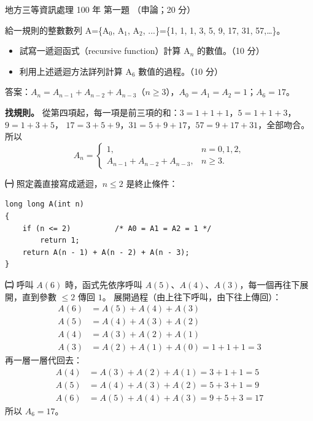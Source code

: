 \begin{pastexam}[label={px:df3-100-ds-01}]{地方三等資訊處理 100 年 第一題}
（申論；20 分）

給一規則的整數數列 A=\{A$_0$, A$_1$, A$_2$, ...\}=\{1, 1, 1, 3, 5, 9, 17, 31, 57,…\}。
\begin{itemize}[leftmargin=2.2em, nosep]
\item[㈠] 試寫一遞迴函式（recursive function）計算 A$_n$ 的數值。（10 分）
\item[㈡] 利用上述遞迴方法詳列計算 A$_6$ 數值的過程。（10 分）
\end{itemize}
\end{pastexam}

\begin{pastsoln}
答案：$A_n = A_{n-1} + A_{n-2} + A_{n-3}$（$n \ge 3$），$A_0 = A_1 = A_2 = 1$；$A_6 = 17$。

\textbf{找規則。} 從第四項起，每一項是前三項的和：$3 = 1 + 1 + 1$，$5 = 1 + 1 + 3$，$9 = 1 + 3 + 5$，
$17 = 3 + 5 + 9$，$31 = 5 + 9 + 17$，$57 = 9 + 17 + 31$，全部吻合。 所以
\[
A_n = \begin{cases} 1, & n = 0, 1, 2, \\ A_{n-1} + A_{n-2} + A_{n-3}, & n \ge 3. \end{cases}
\]

\textbf{㈠} 照定義直接寫成遞迴，$n \le 2$ 是終止條件：
\begin{verbatim}
long long A(int n)
{
    if (n <= 2)          /* A0 = A1 = A2 = 1 */
        return 1;
    return A(n - 1) + A(n - 2) + A(n - 3);
}
\end{verbatim}

\textbf{㈡} 呼叫 $A(6)$ 時，函式先依序呼叫 $A(5)$、$A(4)$、$A(3)$，每一個再往下展開，直到參數 $\le 2$
傳回 $1$。 展開過程（由上往下呼叫，由下往上傳回）：
\begin{align*}
A(6) &= A(5) + A(4) + A(3) \\
A(5) &= A(4) + A(3) + A(2) \\
A(4) &= A(3) + A(2) + A(1) \\
A(3) &= A(2) + A(1) + A(0) = 1 + 1 + 1 = 3
\end{align*}
再一層一層代回去：
\begin{align*}
A(4) &= A(3) + A(2) + A(1) = 3 + 1 + 1 = 5 \\
A(5) &= A(4) + A(3) + A(2) = 5 + 3 + 1 = 9 \\
A(6) &= A(5) + A(4) + A(3) = 9 + 5 + 3 = 17
\end{align*}
所以 $A_6 = 17$。


\end{pastsoln}

